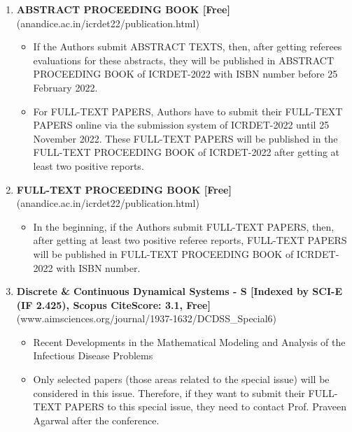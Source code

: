 \documentclass[twoside,11pt]{amsart}
\begin{document}
\begin{enumerate}

\item {\bf ABSTRACT PROCEEDING BOOK [Free]}\\
(anandice.ac.in/icrdet22/publication.html)
\vskip 2mm
\begin{itemize}

  \item If the Authors submit ABSTRACT TEXTS, then, after getting referees evaluations for these abstracts, they will be published in ABSTRACT PROCEEDING BOOK of ICRDET-2022 with ISBN number before 25 February 2022.
  \item For FULL-TEXT PAPERS, Authors have to submit their FULL-TEXT PAPERS online via the submission system of ICRDET-2022 until 25 November 2022. These FULL-TEXT PAPERS will be published in the FULL-TEXT PROCEEDING BOOK of ICRDET-2022 after getting at least two positive reports.
      
\end{itemize}

\item {\bf FULL-TEXT PROCEEDING BOOK [Free]}\\
(anandice.ac.in/icrdet22/publication.html)

\begin{itemize}

\item In the beginning, if the Authors submit FULL-TEXT PAPERS, then, after getting at least two positive referee reports, FULL-TEXT PAPERS will be published in FULL-TEXT PROCEEDING BOOK of ICRDET-2022 with ISBN number.
    
\end{itemize}


\item {\bf Discrete \& Continuous Dynamical Systems - S [Indexed by SCI-E (IF 2.425), Scopus CiteScore: 3.1, Free]}\\
(www.aimsciences.org/journal/1937-1632/DCDSS_Special6)

\begin{itemize}

\item Recent Developments in the Mathematical Modeling and Analysis of the Infectious Disease Problems
\item Only selected papers (those areas related to the special issue) will be considered in this issue. Therefore, if they want to submit their FULL-TEXT PAPERS to this special issue, they need to contact Prof. Praveen Agarwal after the conference.
    

\end{itemize}
\end{enumerate}
\end{document}

